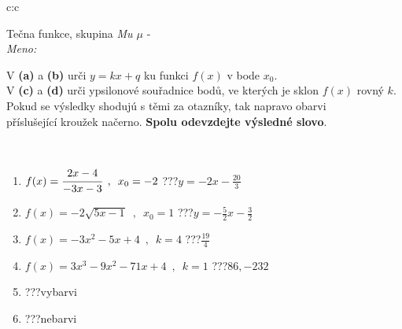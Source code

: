 \documentclass[10pt]{report}
\begin{document}
\newpage
\thispagestyle{empty}
\begin{tabular}{c:c}
\begin{minipage}[c][104.5mm][t]{0.5\linewidth}
\begin{center}
\vspace{7mm}
{\huge Tečna funkce, skupina \textit{Mu $\mu$} -}\\[5mm]
\textit{Meno:}\phantom{xxxxxxxxxxxxxxxxxxxxxxxxxxxxxxxxxxxxxxxxxxxxxxxxxxxxxxxxxxxxxxxxx}\\[5mm]
\begin{minipage}{0.95\linewidth}
\begin{center}
V \textbf{(a)} a \textbf{(b)} urči  $y = kx + q$ ku funkci $f(x)$ v bode $x_0$.\\V \textbf{(c)} a \textbf{(d)} urči ypsilonové souřadnice bodů, ve kterých je sklon $f(x)$ rovný $k$.\\Pokud se výsledky shodujú s těmi za otazníky, tak napravo obarvi\\příslušející kroužek načerno. \textbf{Spolu odevzdejte výsledné slovo}.
\end{center}
\end{minipage}
\\[1mm]
\begin{minipage}{0.79\linewidth}
\begin{center}
\begin{varwidth}{\linewidth}
\begin{enumerate}
\small
\item $f(x)=\cfrac{2x-4}{-3x-3}\enspace , \enspace x_0=-2$\quad \dotfill\; ???\;\dotfill \quad $y = -2x-\frac{20}{3}$
\item $f(x)=-2\sqrt{5x-1}\enspace , \enspace x_0=1$\quad \dotfill\; ???\;\dotfill \quad $y = -\frac{5}{2}x-\frac{3}{2}$
\item $f(x)=-3x^2-5x+4\enspace , \enspace k=4$\quad \dotfill\; ???\;\dotfill \quad $\frac{19}{4}$
\item $f(x)=3x^3-9x^2-71x+4\enspace , \enspace k=1$\quad \dotfill\; ???\;\dotfill \quad $86 , -232$
\item \quad \dotfill\; ???\;\dotfill \quad vybarvi
\item \quad \dotfill\; ???\;\dotfill \quad nebarvi
\end{enumerate}
\end{varwidth}
\end{center}
\end{minipage}
\begin{minipage}{0.20\linewidth}

\end{minipage}
\end{center}
\end{minipage}
\end{tabular}
\end{document}
